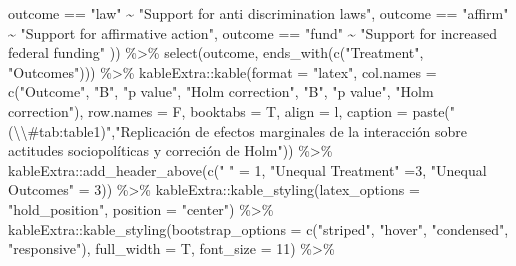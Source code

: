 \documentclass[
  13pt,
  a4paper,
]{article}
\newenvironment{Shaded}{\begin{snugshade}}{\end{snugshade}}
\newcommand{\AttributeTok}[1]{\textcolor[rgb]{0.77,0.63,0.00}{#1}}
\newcommand{\DecValTok}[1]{\textcolor[rgb]{0.00,0.00,0.81}{#1}}
\newcommand{\FunctionTok}[1]{\textcolor[rgb]{0.00,0.00,0.00}{#1}}
\newcommand{\NormalTok}[1]{#1}
\newcommand{\OtherTok}[1]{\textcolor[rgb]{0.56,0.35,0.01}{#1}}
\newcommand{\SpecialCharTok}[1]{\textcolor[rgb]{0.00,0.00,0.00}{#1}}
\newcommand{\StringTok}[1]{\textcolor[rgb]{0.31,0.60,0.02}{#1}}
\begin{document}
\begin{Shaded}
\begin{Highlighting}[]
\NormalTok{    outcome }\SpecialCharTok{==} \StringTok{"law"} \SpecialCharTok{\textasciitilde{}} \StringTok{"Support for anti discrimination laws"}\NormalTok{,}
\NormalTok{    outcome }\SpecialCharTok{==} \StringTok{"affirm"} \SpecialCharTok{\textasciitilde{}} \StringTok{"Support for affirmative action"}\NormalTok{,}
\NormalTok{    outcome }\SpecialCharTok{==} \StringTok{"fund"} \SpecialCharTok{\textasciitilde{}} \StringTok{"Support for increased federal funding"}
\NormalTok{  )) }\SpecialCharTok{\%\textgreater{}\%} 
  \FunctionTok{select}\NormalTok{(outcome, }\FunctionTok{ends\_with}\NormalTok{(}\FunctionTok{c}\NormalTok{(}\StringTok{"Treatment"}\NormalTok{, }\StringTok{"Outcomes"}\NormalTok{))) }\SpecialCharTok{\%\textgreater{}\%} 
\NormalTok{  kableExtra}\SpecialCharTok{::}\FunctionTok{kable}\NormalTok{(}\AttributeTok{format =} \StringTok{"latex"}\NormalTok{, }
                    \AttributeTok{col.names =} \FunctionTok{c}\NormalTok{(}\StringTok{"Outcome"}\NormalTok{, }\StringTok{"B"}\NormalTok{, }\StringTok{"p value"}\NormalTok{, }\StringTok{"Holm correction"}\NormalTok{, }\StringTok{"B"}\NormalTok{, }\StringTok{"p value"}\NormalTok{, }\StringTok{"Holm correction"}\NormalTok{),}
                    \AttributeTok{row.names =}\NormalTok{ F,}
                    \AttributeTok{booktabs =}\NormalTok{ T, }\AttributeTok{align =} \StringTok{\textquotesingle{}l\textquotesingle{}}\NormalTok{,}
                    \AttributeTok{caption =} \FunctionTok{paste}\NormalTok{(}\StringTok{"(}\SpecialCharTok{\textbackslash{}\textbackslash{}}\StringTok{\#tab:table1)"}\NormalTok{,}\StringTok{"Replicación de efectos marginales de la interacción sobre actitudes sociopolíticas y correción de Holm"}\NormalTok{)) }\SpecialCharTok{\%\textgreater{}\%} 
\NormalTok{  kableExtra}\SpecialCharTok{::}\FunctionTok{add\_header\_above}\NormalTok{(}\FunctionTok{c}\NormalTok{(}\StringTok{" "} \OtherTok{=} \DecValTok{1}\NormalTok{, }\StringTok{"Unequal Treatment"} \OtherTok{=}\DecValTok{3}\NormalTok{, }\StringTok{"Unequal Outcomes"} \OtherTok{=} \DecValTok{3}\NormalTok{)) }\SpecialCharTok{\%\textgreater{}\%} 
\NormalTok{  kableExtra}\SpecialCharTok{::}\FunctionTok{kable\_styling}\NormalTok{(}\AttributeTok{latex\_options =} \StringTok{"hold\_position"}\NormalTok{, }
                            \AttributeTok{position =} \StringTok{"center"}\NormalTok{) }\SpecialCharTok{\%\textgreater{}\%}
\NormalTok{  kableExtra}\SpecialCharTok{::}\FunctionTok{kable\_styling}\NormalTok{(}\AttributeTok{bootstrap\_options =} \FunctionTok{c}\NormalTok{(}\StringTok{"striped"}\NormalTok{, }\StringTok{"hover"}\NormalTok{, }\StringTok{"condensed"}\NormalTok{, }\StringTok{"responsive"}\NormalTok{), }\AttributeTok{full\_width =}\NormalTok{ T, }\AttributeTok{font\_size =} \DecValTok{11}\NormalTok{) }\SpecialCharTok{\%\textgreater{}\%} 

\end{Highlighting}
\end{Shaded}
\end{document}

